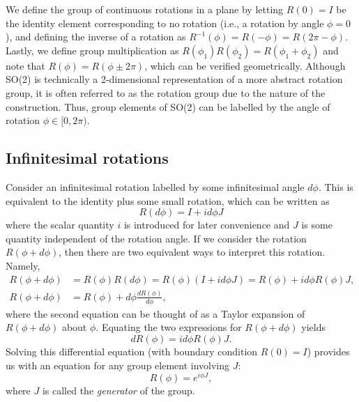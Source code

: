 We define the group of continuous rotations in a plane by letting $R(0) = I$ be the identity element corresponding to no rotation (i.e., a rotation by angle $\phi=0$), and defining the inverse of a rotation as $R^{-1}(\phi) = R(-\phi) = R(2\pi-\phi)$. Lastly, we define group multiplication as $R(\phi_1)R(\phi_2) = R(\phi_1+\phi_2)$ and note that $R(\phi) = R(\phi\pm2\pi)$, which can be verified geometrically. Although SO(2) is technically a 2-dimensional representation of a more abstract rotation group, it is often referred to as the rotation group due to the nature of the construction. Thus, group elements of SO(2) can be labelled by the angle of rotation $\phi\in[0,2\pi)$.

\subsection{Infinitesimal rotations}\label{sub:inf_rot}
Consider an infinitesimal rotation labelled by some infinitesimal angle $d\phi$. This is equivalent to the identity plus some small rotation, which can be written as
\begin{equation}
    R(d\phi) = I + i d\phi J \label{eq:dphi}
\end{equation}
where the scalar quantity $i$ is introduced for later convenience and $J$ is some quantity independent of the rotation angle. If we consider the rotation $R(\phi + d\phi)$, then there are two equivalent ways to interpret this rotation. Namely,
\begin{align}
    R(\phi + d\phi) &= R(\phi)R(d\phi) = R(\phi)(I + i d\phi J) = R(\phi) + i d\phi R(\phi)J,\label{eq:dphi1} \\
    R(\phi + d\phi) &= R(\phi) + d\phi\frac{dR(\phi)}{d\phi},\label{eq:dphi2}
\end{align}
where the second equation can be thought of as a Taylor expansion of $R(\phi + d\phi)$ about $\phi$. Equating the two expressions for $R(\phi + d\phi)$ yields
\begin{equation}
    dR(\phi) = id\phi R(\phi)J.
\end{equation}
Solving this differential equation (with boundary condition $R(0)=I$) provides us with an equation for any group element involving $J$:
\begin{equation}
    R(\phi) = e^{i\phi J},
\end{equation}
where $J$ is called the \textit{generator} of the group.

